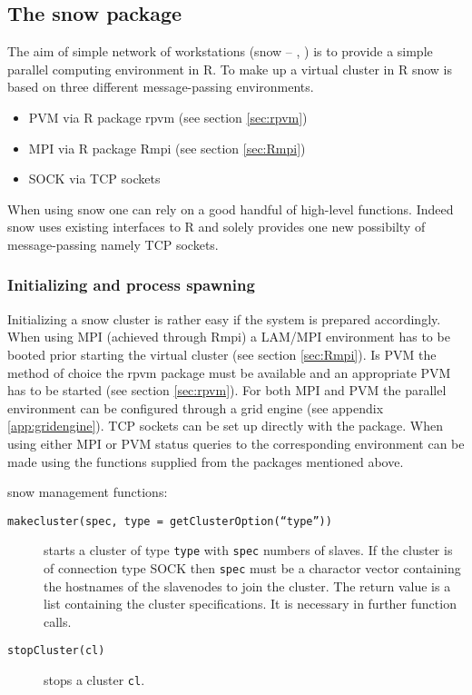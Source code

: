 \subsection{The snow package}
\label{sec:snow}
The aim of simple network of workstations (snow --
\cite{rossini03snow}, \cite{tierney07snow}) is to provide a simple
parallel computing environment in R. To make up a virtual cluster in R
snow is based on three different message-passing environments.

\begin{itemize}
\item PVM via R package rpvm (see section \ref{sec:rpvm})
\item MPI via R package Rmpi (see section \ref{sec:Rmpi})
\item SOCK via TCP sockets
\end{itemize}

When using snow one can rely on a good handful of high-level
functions. Indeed snow uses existing interfaces to R and solely
provides one new possibilty of message-passing namely TCP sockets. 

\subsubsection{Initializing and process spawning}

Initializing a snow cluster is rather easy if the system is prepared
accordingly. When using MPI (achieved through Rmpi) a LAM/MPI
environment has to be booted prior starting the virtual cluster (see
section \ref{sec:Rmpi}). Is PVM the method of choice the rpvm package
must be available and an appropriate PVM has to be started (see
section \ref{sec:rpvm}). For both MPI and PVM the parallel environment
can be configured through a grid engine (see appendix
\ref{app:gridengine}). TCP sockets can be set up directly with the
package. When using either MPI or PVM status queries to the
corresponding environment can be made using the functions supplied
from the packages mentioned above.


snow management functions:

\begin{description}
\item[\texttt{makecluster(spec, type = getClusterOption(``type''))}]
  starts a cluster of type \texttt{type} with \texttt{spec} numbers of
  slaves. If the cluster is of connection type SOCK then \texttt{spec}
  must be a charactor vector containing the hostnames of the
  slavenodes to join the cluster. The return value is a list
  containing the cluster specifications. It is necessary in further
  function calls.
\item[\texttt{stopCluster(cl)}] stops a cluster \texttt{cl}.
\end{description}


